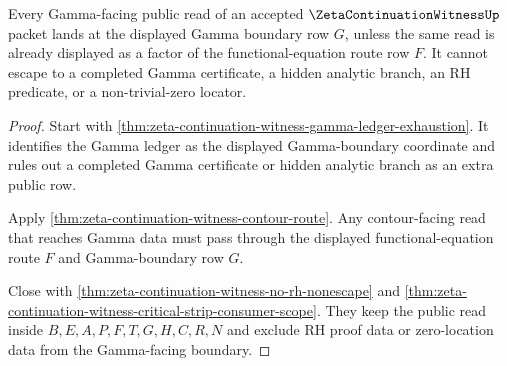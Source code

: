 \begin{theorem}
\label{thm:zeta-continuation-witness-gamma-boundary-public-nonescape}
Every Gamma-facing public read of an accepted $\ZetaContinuationWitnessUp$ packet lands at the displayed Gamma boundary row $G$, unless the same read is already displayed as a factor of the functional-equation route row $F$. It cannot escape to a completed Gamma certificate, a hidden analytic branch, an RH predicate, or a non-trivial-zero locator.
\end{theorem}
\begin{proof}
Start with \autoref{thm:zeta-continuation-witness-gamma-ledger-exhaustion}. It identifies the Gamma ledger as the displayed Gamma-boundary coordinate and rules out a completed Gamma certificate or hidden analytic branch as an extra public row.

Apply \autoref{thm:zeta-continuation-witness-contour-route}. Any contour-facing read that reaches Gamma data must pass through the displayed functional-equation route $F$ and Gamma-boundary row $G$.

Close with \autoref{thm:zeta-continuation-witness-no-rh-nonescape} and \autoref{thm:zeta-continuation-witness-critical-strip-consumer-scope}. They keep the public read inside $B,E,A,P,F,T,G,H,C,R,N$ and exclude RH proof data or zero-location data from the Gamma-facing boundary.
\end{proof}

